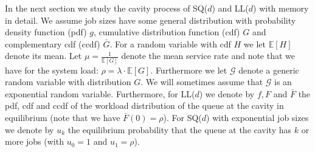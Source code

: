 \documentclass[12pt]{report}
\newcommand{\E}{\mathbb{E}}
\newcommand{\GG}{\mathcal{G}}
\begin{document}
In the next section we study the
cavity process of SQ($d$) and LL($d$) with memory in detail. 
We assume job sizes have some general distribution with 
probability density function (pdf) $g$, 
cumulative distribution function (cdf) $G$ and complementary cdf (ccdf) $\bar G$. For a random variable with cdf $H$ we let $\E[H]$ denote its mean. Let $\mu = \frac{1}{\E[G]}$ denote the mean service rate and note that we have for the system load: $\rho = \lambda \cdot \E[G]$. Furthermore we let $\GG$ denote a generic random variable with distribution $G$. We will sometimes assume that $\GG$ is an exponential random variable. Furthermore, for LL($d$) we denote by $f, F$ and $\bar F$ the pdf, cdf and ccdf of the workload distribution of the queue at the cavity in equilibrium (note that we have $\bar F(0) = \rho$). For SQ($d$) with exponential job sizes we denote by $u_k$ the equilibrium probability that the queue at the cavity has $k$ or more jobs (with $u_0=1$ and $u_1=\rho$).


\end{document}
